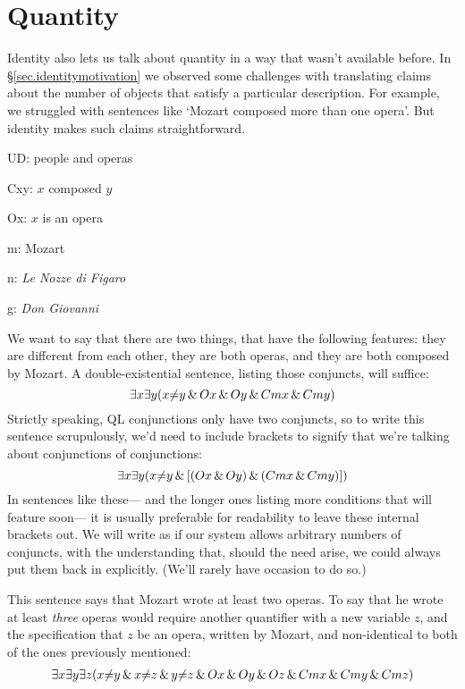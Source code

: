 \section{Quantity}
\label{sec.quantity}

Identity also lets us talk about quantity in a way that wasn't available before. In \S\ref{sec.identitymotivation} we observed some challenges with translating claims about the number of objects that satisfy a particular description. For example, we struggled with sentences like `Mozart composed more than one opera'. But identity makes such claims straightforward.

\begin{ekey}
\item[UD:] people and operas
\item[Cxy:] $x$ composed $y$
\item[Ox:] $x$ is an opera
\item[m:] Mozart
\item[n:] \emph{Le Nozze di Figaro}
\item[g:] \emph{Don Giovanni}
\end{ekey}

We want to say that there are two things, that have the following features: they are different from each other, they are both operas, and they are both composed by Mozart. A double-existential sentence, listing those conjuncts, will suffice: 
$$\exists x \exists y (x {\neq} y \,\&\, Ox \,\&\, Oy \,\&\, Cmx \,\&\, Cmy)$$
Strictly speaking, QL conjunctions only have two conjuncts, so to write this sentence scrupulously, we'd need to include brackets to signify that we're talking about conjunctions of conjunctions:
$$\exists x \exists y (x {\neq} y \,\&\, [(Ox \,\&\, Oy) \,\&\, (Cmx \,\&\, Cmy)])$$
In sentences like these--- and the longer ones listing more conditions that will feature soon--- it is usually preferable for readability to leave these internal brackets out. We will write as if our system allows arbitrary numbers of conjuncts, with the understanding that, should the need arise, we could always put them back in explicitly. (We'll rarely have occasion to do so.)

This sentence says that Mozart wrote at least two operas. To say that he wrote at least \emph{three} operas would require another quantifier with a new variable $z$, and the specification that $z$ be an opera, written by Mozart, and non-identical to both of the ones previously mentioned:
\begin{multline*}
\exists x \exists y \exists z (x {\neq} y \,\&\, x {\neq} z \,\&\, y {\neq} z \,\&\, 
Ox \,\&\, Oy \,\&\, Oz \,\&\, Cmx \,\&\, Cmy \,\&\, Cmz)
\end{multline*}

